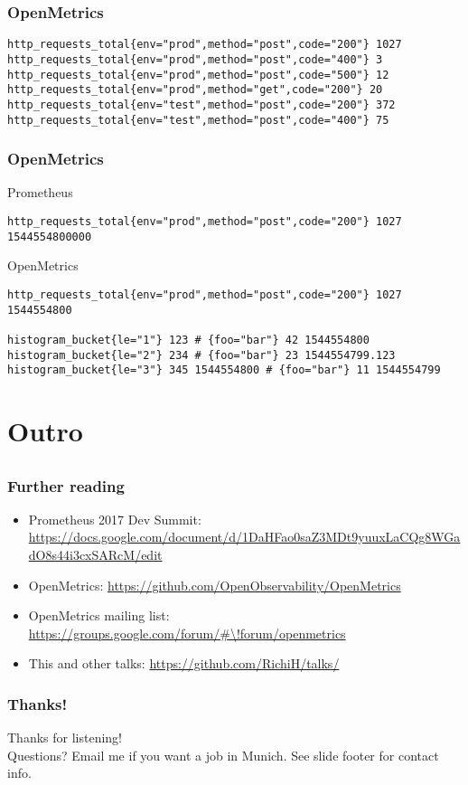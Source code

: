 \documentclass[aspectratio=169]{beamer}
\begin{document}
\begin{frame}[fragile]
        \frametitle{OpenMetrics}
        \fontsize{10pt}{12}\selectfont
        \begin{verbatim}
http_requests_total{env="prod",method="post",code="200"} 1027
http_requests_total{env="prod",method="post",code="400"} 3
http_requests_total{env="prod",method="post",code="500"} 12
http_requests_total{env="prod",method="get",code="200"} 20
http_requests_total{env="test",method="post",code="200"} 372
http_requests_total{env="test",method="post",code="400"} 75
        \end{verbatim}
\end{frame}

\begin{frame}[fragile]
        \frametitle{OpenMetrics}
        \fontsize{10pt}{12}\selectfont
Prometheus
        \begin{verbatim}
http_requests_total{env="prod",method="post",code="200"} 1027 1544554800000
        \end{verbatim}
OpenMetrics
        \begin{verbatim}
http_requests_total{env="prod",method="post",code="200"} 1027 1544554800

histogram_bucket{le="1"} 123 # {foo="bar"} 42 1544554800
histogram_bucket{le="2"} 234 # {foo="bar"} 23 1544554799.123
histogram_bucket{le="3"} 345 1544554800 # {foo="bar"} 11 1544554799
        \end{verbatim}
\end{frame}



\section{Outro}

\subsection{}

\begin{frame}
	\frametitle{Further reading}
	\vfill
	\begin{itemize}
		\item Prometheus 2017 Dev Summit: \url{https://docs.google.com/document/d/1DaHFao0saZ3MDt9yuuxLaCQg8WGadO8s44i3cxSARcM/edit}
		\item OpenMetrics: \url{https://github.com/OpenObservability/OpenMetrics}
		\item OpenMetrics mailing list: \url{https://groups.google.com/forum/\#\!forum/openmetrics}
		\item This and other talks: \url{https://github.com/RichiH/talks/}
	\end{itemize}
	\vfill
\end{frame}

\begin{frame}
	\frametitle{Thanks!}
		\begin{center}
			\vfill
			Thanks for listening!\\
			\vfill
			Questions?
			\vfill
			Email me if you want a job in Munich.
			\vfill
			See slide footer for contact info.
			\vfill
		\end{center}
\end{frame}
\end{document}
